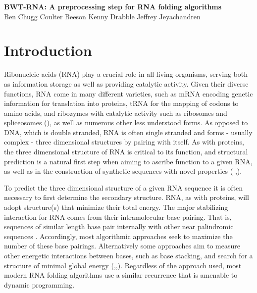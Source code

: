 \documentclass[11pt]{article}
\begin{document}
\begin{center}
\Large\textbf{BWT-RNA: A preprocessing step for RNA folding algorithms}\\
\vspace*{0.8cm}
\large 
Ben Chugg \qquad
Coulter Beeson \qquad
Kenny Drabble \qquad
Jeffrey Jeyachandren 
\end{center}
\vspace*{0.3cm}

\begin{abstract}
\end{abstract}

\section{Introduction}

Ribonucleic acids (RNA) play a crucial role in all living organisms, serving both as information storage as well as providing catalytic activity. Given their diverse functions, RNA come in many different varieties, such as mRNA encoding genetic information for translation into proteins, tRNA for the mapping of codons to amino acids, and ribozymes with catalytic activity such as ribosomes and spliceosomes (\cite{eight}\cite{nine}\cite{ten}), as well as numerous other less understood forms. As opposed to DNA, which is double stranded, RNA is often single stranded and forms - usually complex -  three dimensional structures by pairing with itself. As with proteins, the three dimensional structure of RNA is critical to its function, and structural prediction is a natural first step when aiming to ascribe function to a given RNA, as well as in the construction of synthetic sequences with novel properties ( \cite{one},\cite{two}). 

To predict the three dimensional structure of a given RNA sequence it is often necessary to first determine the secondary structure. RNA, as with proteins, will adopt structure(s) that minimize their total energy. The major stabilizing interaction for RNA comes from their intramolecular base pairing. That is, sequences of similar length base pair internally with other near palindromic sequences \cite{three}. Accordingly, most algorithmic approaches seek to maximize the number of these base pairings. Alternatively some approaches aim to measure other energetic interactions between bases, such as base stacking, and search for a structure of minimal global energy (\cite{four},\cite{five},\cite{eight}). Regardless of the approach used, most modern RNA folding algorithms use a similar recurrence that is amenable to dynamic programming. 
\end{document}
